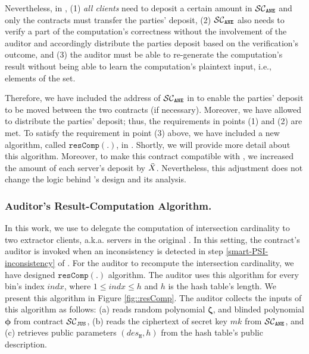 Nevertheless, in \epsi, (1) \emph{all clients} need to deposit a certain amount in $\mathcal{SC}_{\mathtt{ANE}}$ and only the contracts must transfer the parties' deposit,  (2) $\mathcal{SC}_{\mathtt{ANE}}$ also needs to verify a part of the computation's correctness without the involvement of the auditor and accordingly distribute the parties deposit based on the verification's outcome,  and (3) the auditor must be able to re-generate the computation's result without being able to learn the computation's plaintext input, i.e., elements of the set. 

Therefore, we have included the address of $\mathcal{SC}_{\mathtt{ANE}}$ in \SCpc to enable the parties' deposit to be moved between the two contracts (if necessary). Moreover, we have allowed \SCpc to distribute the parties' deposit; thus, the requirements in points (1) and (2) are met. To satisfy the requirement in point (3) above, we have included a new algorithm, called $\mathtt{resComp}(.)$, in \SCpc.  Shortly, we will provide more detail about this algorithm. Moreover, to make this contract compatible with \epsi, we increased the amount of each server's deposit by  $\ddot{X}$. Nevertheless, this adjustment does not change the logic behind \SCpc's design and its analysis.  







\subsubsection{Auditor's Result-Computation Algorithm.}\label{sec::auditor-res-Comp}


In this work,  we use \SCpc to delegate the computation of intersection cardinality to two extractor clients, a.k.a. servers in the original \SCpc. In this setting, the contract's auditor is invoked when an inconsistency is detected in step \ref{smart-PSI-inconsistency} of \epsi. For the auditor to recompute the intersection cardinality, we have designed $\mathtt{resComp}(.)$ algorithm. The auditor uses this algorithm for every bin's index $indx$,  where $1\leq indx\leq h$ and $h$ is the hash table's length. We present this algorithm in Figure \ref{fig::resComp}.  The auditor collects the inputs of this algorithm as follows: (a)  reads random polynomial $\bm\zeta$, and blinded polynomial $\bm\phi$ from contract $\mathcal{SC}_{\mathtt{JUS}}$, (b) reads the ciphertext of secret key $mk$ from $\mathcal{SC}_{\mathtt{ANE}}$, and (c) retrieves public parameters $(des_{\mathtt{H}}, h)$ from the hash table's public description. 



